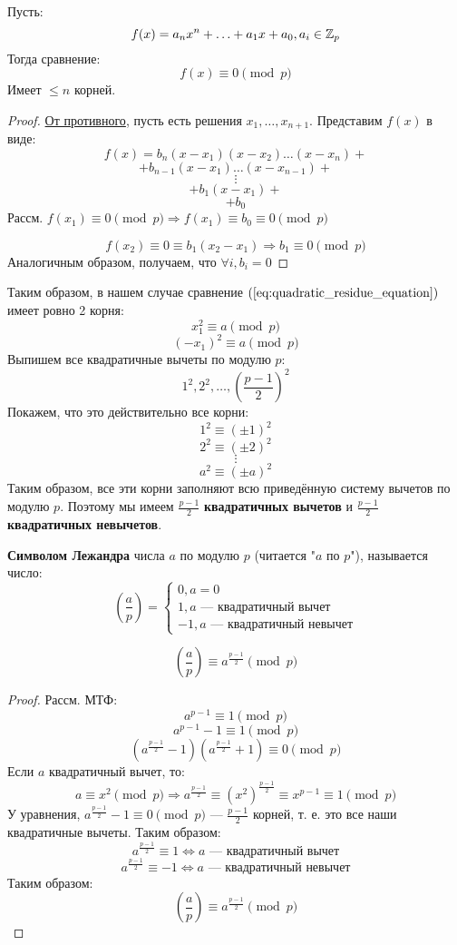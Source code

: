 \begin{theorem}[Лагранжа]
\label{theorem:01_1}
Пусть:
\[
  f(x) = a_n x^{n} + \ldots + a_1 x + a_0, a_i \in \mathbb{Z}_p
\]
Тогда сравнение:
\[
  f(x) \equiv 0 \pmod p
\]
Имеет $ \leq n$ корней.
\end{theorem}
\begin{proof}
\underline{От противного}, пусть есть решения $x_1, \ldots, x_{n + 1}$. Представим $f(x)$ в виде:
\[
  f(x) = b_n(x - x_1)(x - x_2)\ldots(x - x_n) + 
\]
\[
     +  b_{n - 1}(x - x_1)\ldots(x - x_{n - 1}) +
\]
\[
        \vdots
\]
\[
    +  b_1(x - x_1) + 
\]
\[
      + b_0
\]
Рассм. $f(x_1) \equiv 0 \pmod p \Rightarrow f(x_1) \equiv b_0 \equiv 0 \pmod p$ 

\[
f(x_2) \equiv 0 \equiv b_1(x_2 - x_1) \Rightarrow b_1 \equiv 0 \pmod p
\]
Аналогичным образом, получаем, что $\forall i, b_i = 0$
\end{proof}
Таким образом, в нашем случае сравнение $(\ref{eq:quadratic_residue_equation})$ имеет ровно 2 корня:
\[
  x_1^{2} \equiv a \pmod p
\]
\[
  (-x_1)^{2} \equiv a \pmod p
\]
Выпишем все квадратичные вычеты по модулю $p$:
\[
1^{2}, 2^{2}, \ldots, \left(\frac{p - 1}{2}\right)^{2}
\]
Покажем, что это действительно все корни:
\[
1^{2} \equiv (\pm 1)^{2}
\]
\[
2^{2} \equiv (\pm 2)^{2}
\]
\[
\vdots
\]
\[
a^{2} \equiv (\pm a)^{2}
\]
Таким образом, все эти корни заполняют всю приведённую систему вычетов по модулю $p$. Поэтому мы имеем $\frac{p - 1}{2}$ \textbf{квадратичных вычетов} и $\frac{p - 1}{2}$ \textbf{квадратичных невычетов}.
\begin{definition}
\textbf{Символом Лежандра} числа $a$ по модулю $p$ (читается "$a$ по $p$"), называется число:
\[
  \left(\frac{a}{p}\right) = \begin{cases}
  0, a = 0 \\
  1, a \text{ --- квадратичный вычет} \\
  -1, a \text{ --- квадратичный невычет}
  \end{cases}
\]
\end{definition}
\begin{statement}
  \label{statement:01_1}
\[
\left(\frac{a}{p}\right) \equiv a^{\frac{p - 1}{2}} \pmod p
\]
\end{statement}
\begin{proof}
Рассм. МТФ:
\[
a^{p - 1} \equiv 1 \pmod p
\]
\[
a^{p - 1} - 1 \equiv 1 \pmod p
\]
\[
  (a^{\frac{p - 1}{2}} - 1)(a^{\frac{p - 1}{2}} + 1) \equiv 0 \pmod p
\]
Если $a$ квадратичный вычет, то:
\[
a \equiv x^{2} \pmod p \Rightarrow a^{\frac{p - 1}{2}} \equiv (x^{2})^{\frac{p - 1}{2}} \equiv x^{p - 1} \equiv 1 \pmod p
\]
У уравнения, $a^{\frac{p - 1}{2}} - 1 \equiv 0 \pmod p$ --- $\frac{p - 1}{2}$ корней, т. е. это все наши квадратичные вычеты. Таким образом:
\[
a^{\frac{p - 1}{2}} \equiv 1 \iff a \text{ --- квадратичный вычет}
\]
\[
a^{\frac{p - 1}{2}} \equiv -1 \iff a \text{ --- квадратичный невычет}
\]
Таким образом:
\[
\left(\frac{a}{p}\right) \equiv a^{\frac{p - 1}{2}} \pmod p
\]
\end{proof}
